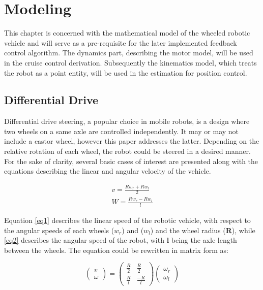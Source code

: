\chapter{Modeling} \label{ch:modeling}

This chapter is concerned with the mathematical model of the wheeled robotic vehicle and will serve as a pre-requisite for the later implemented feedback control algorithm. 
The dynamics part, describing the motor model, will be used in the cruise control derivation. Subsequently the kinematics model, which treats the robot as a point entity, will be used in the estimation for position control.

\section{Differential Drive} \label{kin_model} 

Differential drive steering, a popular choice in mobile robots, is a design where two wheels on a same axle are controlled independently. It may or may not include a castor wheel, however this paper addresses the latter. Depending on the relative rotation of each wheel, the robot could be steered in a desired manner. For the sake of clarity, several basic cases of interest are presented along with the equations describing the linear and angular velocity of the vehicle. 

\begin{align}
v = \frac{Rw_r + Rw_l}{2} \label{eq1} \\
W = \frac{Rw_r - Rw_l}{l} \label{eq2} 
\end{align}

Equation \ref{eq1} describes the linear speed of the robotic vehicle, with respect to the angular speeds of each wheels (\textbf{$w_r$}) and (\textbf{$w_l$}) and the wheel radius (\textbf{R}), while \ref{eq2} describes the angular speed of the robot, with \textbf{l} being the axle length between the wheels. 
The equation could be rewritten in matrix form as:

\begin{equation}  	\label{eq3} 
\begin{pmatrix}
	v \\
	\omega	
\end{pmatrix} 
=
\begin{pmatrix} 
	\frac{R}{2} & \frac{R}{2} \\
	\frac{R}{l} & \frac{-R}{l} 
\end{pmatrix}
\begin{pmatrix}
	\omega_r \\
	\omega_l
\end{pmatrix}  	
\end{equation}

